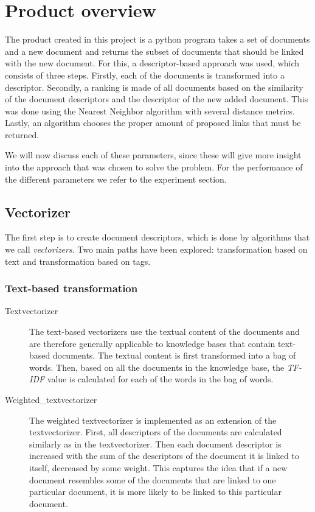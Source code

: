 \section{Product overview}

The product created in this project is a python program takes a set of
documents and a new document and returns the subset of documents that should be
linked with the new document. For this, a descriptor-based approach was used,
which consists of three steps. Firstly, each of the documents is transformed
into a descriptor. Secondly, a ranking is made of all documents based on the
similarity of the document descriptors and the descriptor of the new added
document. This was done using the Nearest Neighbor algorithm with several
distance metrics. Lastly, an algorithm chooses the proper amount of proposed
links that must be returned.

We will now discuss each of these parameters, since these will give more
insight into the approach that was chosen to solve the problem. For the
performance of the different parameters we refer to the experiment section. 

\subsection{Vectorizer}
The first step is to create document descriptors, which is done by algorithms that we call \emph{vectorizers}. Two main paths have been explored: transformation based on text and transformation based on tags.

\subsubsection{Text-based transformation}
\begin{description}
\item [Textvectorizer] The text-based vectorizers use the textual content of the documents and are therefore generally applicable to knowledge bases that contain text-based documents. The textual content is first transformed into a bag of words. Then, based on all the documents in the knowledge base, the \emph{TF-IDF} value is calculated for each of the words in the bag of words.  

\item[Weighted\_textvectorizer] The weighted textvectorizer is implemented as an extension of the textvectorizer. First, all descriptors of the documents are calculated similarly as in the textvectorizer. Then each document descriptor is increased with the sum of the descriptors of the document it is linked to itself, decreased by some weight. This captures the idea that if a new document resembles some of the documents that are linked to one particular document, it is more likely to be linked to this particular document. 
\end{description}

